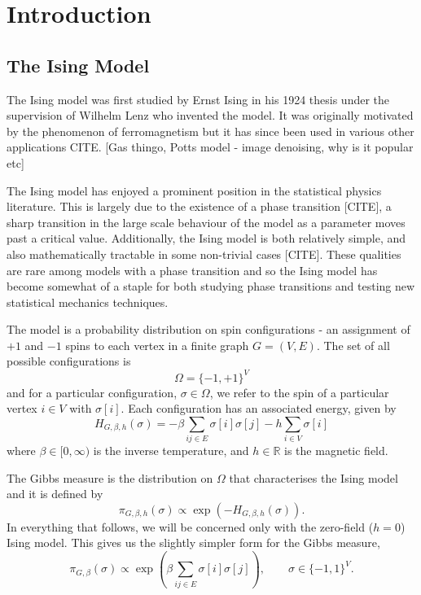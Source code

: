 \chapter{Introduction}
\label{Ch:CouplingIntro}



\section{The Ising Model}
\label{sec:Ising}
	The Ising model was first studied by Ernst Ising in his 1924 thesis \cite{Ising1925-nd} under the supervision of Wilhelm Lenz who invented the model. It was originally motivated by the phenomenon of ferromagnetism but it has since been used in various other applications CITE. [Gas thingo, Potts model - image denoising, why is it popular etc]

	The Ising model has enjoyed a prominent position in the statistical physics literature. This is largely due to the existence of a phase transition [CITE], a sharp transition in the large scale behaviour of the model as a parameter moves past a critical value. Additionally, the Ising model is both relatively simple, and also mathematically tractable in some non-trivial cases [CITE]. These qualities are rare among models with a phase transition and so the Ising model has become somewhat of a staple for both studying phase transitions and testing new statistical mechanics techniques.

	The model is a probability distribution on spin configurations - an assignment of $+1$ and $-1$ spins to each vertex in a finite graph $G = (V, E)$. The set of all possible configurations is
	\begin{equation}
		\Omega = \{-1, +1\}^V
	\end{equation}
	and for a particular configuration, $\sigma \in \Omega$, we refer to the spin of a particular vertex $i \in V$ with $\sigma[i]$. Each configuration has an associated energy, given by 
	\begin{equation}
		H_{G, \beta, h}(\sigma) = -\beta \sum_{ij \in E} \sigma[i] \sigma[j] - h\sum_{i \in V} \sigma[i]
	\end{equation}
	where $\beta \in [0, \infty)$ is the inverse temperature, and $h \in \mathbb{R}$ is the magnetic field. 

	The Gibbs measure is the distribution on $\Omega$ that characterises the Ising model and it is defined by
	\begin{equation}
		\pi_{G, \beta, h}(\sigma) \propto \exp(-H_{G, \beta, h}(\sigma)).
		\label{eq:gibbsmeasurefull}
	\end{equation}
	In everything that follows, we will be concerned only with the zero-field ($h = 0$) Ising model. This gives us the slightly simpler form for the Gibbs measure,
	\begin{equation}
		\pi_{G, \beta}(\sigma) \propto \exp \left( \beta \sum_{ij \in E} \sigma[i] \sigma[j] \right), \qquad \sigma \in \{-1, 1\}^V.
		\label{eq:gibbsmeasure}
	\end{equation}


